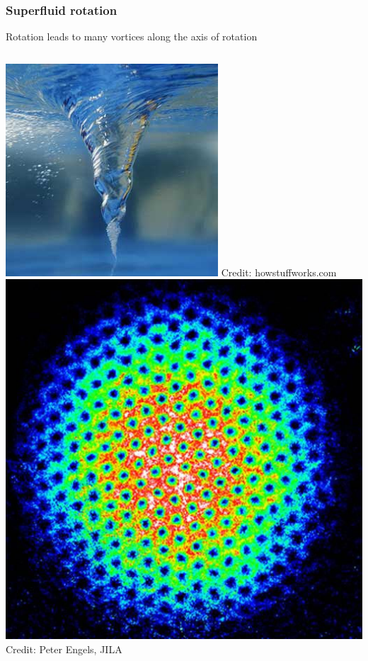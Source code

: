 \documentclass{beamer}
\begin{document}
\begin{frame}
\frametitle{Superfluid rotation}
\center Rotation leads to many vortices along the axis of rotation
\vspace{0.25cm}

\begin{columns}
\includegraphics[width=\textwidth]{vortex.jpg}
\tiny{Credit: howstuffworks.com}
\center{\huge $\rightarrow$}
\includegraphics[width=\textwidth]{vortexlattice.jpg}
\tiny{Credit: Peter Engels, JILA}
\end{columns}


\end{frame}
\end{document}

